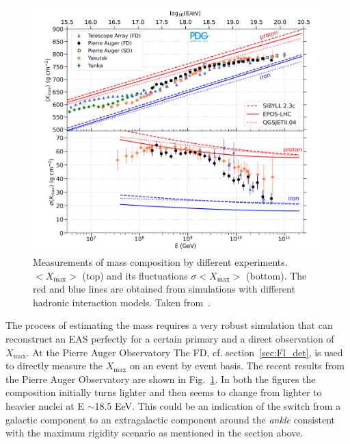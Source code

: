 \begin{figure}[t!]
  \centering
  \includegraphics[width=14.5cm]{thesis_figures/CRnNu/Composition_measurement.png}
  \caption{Measurements of mass composition by different experiments. $<X_{\text{max}}>$ (top) and its fluctuations $\sigma<X_{\text{max}}>$ (bottom). The red and blue lines are obtained from simulations with different hadronic interaction models. Taken from~\cite{ParticleDataGroup:2024cfk}.}
  \label{fig:CR-composition}
\end{figure}

The process of estimating the mass requires a very robust simulation that can reconstruct an EAS perfectly for a certain primary and a direct observation of $X_{\text{max}}$. At the Pierre Auger Observatory The \gls{FD}, cf. section~\ref{sec:Fl_det}, is used to directly measure the $X_{\text{max}}$ on an event by event basis. The recent results from the Pierre Auger Observatory are shown in Fig.~\ref{fig:CR-composition}. In both the figures the composition initially turns lighter and then seems to change from lighter to heavier nuclei at E $\sim$18.5 EeV. This could be an indication of the switch from a galactic component to an extragalactic component around the \textit{ankle} consistent with the maximum rigidity scenario as mentioned in the section above.

